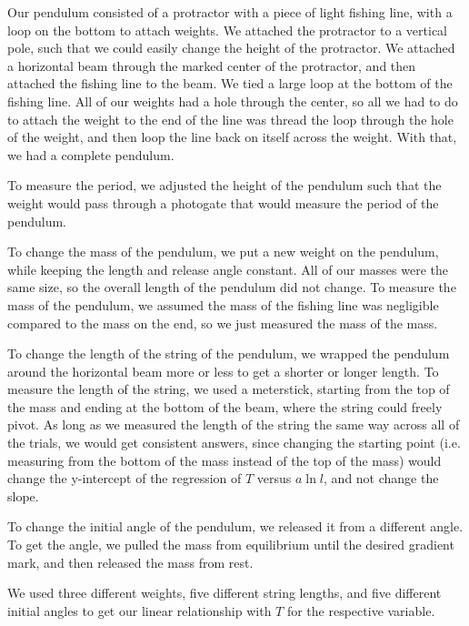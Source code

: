 \documentclass[12pt]{article}
\begin{document}
Our pendulum consisted of a protractor with a piece of light fishing line, with a loop on the bottom to attach weights. We attached the protractor to a vertical pole, such that we could easily change the height of the protractor. We attached a horizontal beam through the marked center of the protractor, and then attached the fishing line to the beam. We tied a large loop at the bottom of the fishing line. All of our weights had a hole through the center, so all we had to do to attach the weight to the end of the line was thread the loop through the hole of the weight, and then loop the line back on itself across the weight. With that, we had a complete pendulum.

To measure the period, we adjusted the height of the pendulum such that the weight would pass through a photogate that would measure the period of the pendulum.

To change the mass of the pendulum, we put a new weight on the pendulum, while keeping the length and release angle constant. All of our masses were the same size, so the overall length of the pendulum did not change. To measure the mass of the pendulum, we assumed the mass of the fishing line was negligible compared to the mass on the end, so we just measured the mass of the mass.

To change the length of the string of the pendulum, we wrapped the pendulum around the horizontal beam more or less to get a shorter or longer length. To measure the length of the string, we used a meterstick, starting from the top of the mass and ending at the bottom of the beam, where the string could freely pivot. As long as we measured the length of the string the same way across all of the trials, we would get consistent answers, since changing the starting point (i.e. measuring from the bottom of the mass instead of the top of the mass) would change the y-intercept of the regression of \(T\) versus \(a \ln l\), and not change the slope.

To change the initial angle of the pendulum, we released it from a different angle. To get the angle, we pulled the mass from equilibrium until the desired gradient mark, and then released the mass from rest.

We used three different weights, five different string lengths, and five different initial angles to get our linear relationship with \(T\) for the respective variable.
\end{document}
